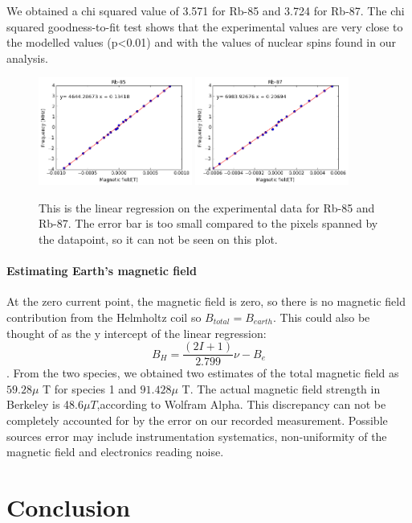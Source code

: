 \documentclass[iop,revtex4]{emulateapj_mod}
\begin{document}
We obtained a chi squared value of 3.571 for Rb-85 and 3.724 for Rb-87. The chi squared goodness-to-fit test shows that the experimental values are very close to the modelled values (p<0.01) and with the values of nuclear spins found in our analysis.
\begin{figure}[h]
\includegraphics[width=0.45\textwidth]{plots/rb85.png}
\includegraphics[width=0.45\textwidth]{plots/rb87.png}
\caption{This is the linear regression on the experimental data for Rb-85 and Rb-87. The error bar is too small compared to the pixels spanned by the datapoint, so it can not be seen on this plot.}
\label{linear_fit}
\end{figure}
\paragraph{Estimating Earth's magnetic field}
\par At the zero current point, the magnetic field is zero, so there is no magnetic field contribution from the Helmholtz coil so $B_{total} = B_{earth}$. This could also be thought of as the y intercept of the linear regression: 
$$ B_H = \frac{(2I+1)}{2.799} \nu - B_e $$.
From the two species, we obtained two estimates of the total magnetic field as $59.28\mu$ T for species 1 and $91.428 \mu$ T. The actual magnetic field strength in Berkeley is 48.6$\mu T$,according to Wolfram Alpha. This discrepancy can not be completely accounted for by the error on our recorded measurement. Possible sources error may include instrumentation systematics, non-uniformity of the magnetic field and electronics reading noise. 
\section{Conclusion}\label{sec:conclusion}
 
\end{document}
